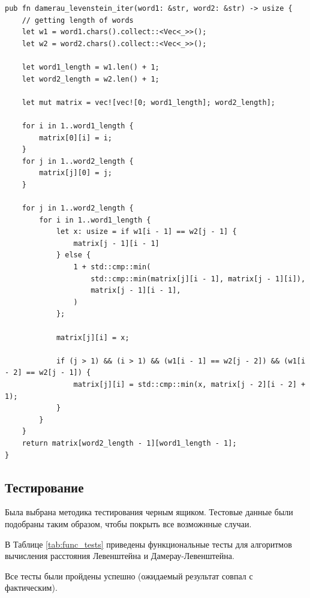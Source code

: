 \documentclass[14pt,russian]{scrartcl}
\begin{document}
\newpage

\begin{lstlisting}[label=some-code,caption=Функция нахождения расстояния Дамерау-Левенштейна матрично]
pub fn damerau_levenstein_iter(word1: &str, word2: &str) -> usize {
    // getting length of words
    let w1 = word1.chars().collect::<Vec<_>>();
    let w2 = word2.chars().collect::<Vec<_>>();

    let word1_length = w1.len() + 1;
    let word2_length = w2.len() + 1;

    let mut matrix = vec![vec![0; word1_length]; word2_length];

    for i in 1..word1_length {
        matrix[0][i] = i;
    }
    for j in 1..word2_length {
        matrix[j][0] = j;
    }

    for j in 1..word2_length {
        for i in 1..word1_length {
            let x: usize = if w1[i - 1] == w2[j - 1] {
                matrix[j - 1][i - 1]
            } else {
                1 + std::cmp::min(
                    std::cmp::min(matrix[j][i - 1], matrix[j - 1][i]),
                    matrix[j - 1][i - 1],
                )
            };

            matrix[j][i] = x;

            if (j > 1) && (i > 1) && (w1[i - 1] == w2[j - 2]) && (w1[i - 2] == w2[j - 1]) {
                matrix[j][i] = std::cmp::min(x, matrix[j - 2][i - 2] + 1);
            }
        }
    }
    return matrix[word2_length - 1][word1_length - 1];
}
\end{lstlisting}

\clearpage

\subsection{Тестирование}

Была выбрана методика тестирования черным ящиком. Тестовые данные были подобраны таким образом, чтобы покрыть все возможнные случаи.

В Таблице \ref{tab:func_tests} приведены функциональные тесты для алгоритмов вычисления расстояния Левенштейна и Дамерау-Левенштейна.

Все тесты были пройдены успешно (ожидаемый результат совпал с фактическим).
\end{document}
